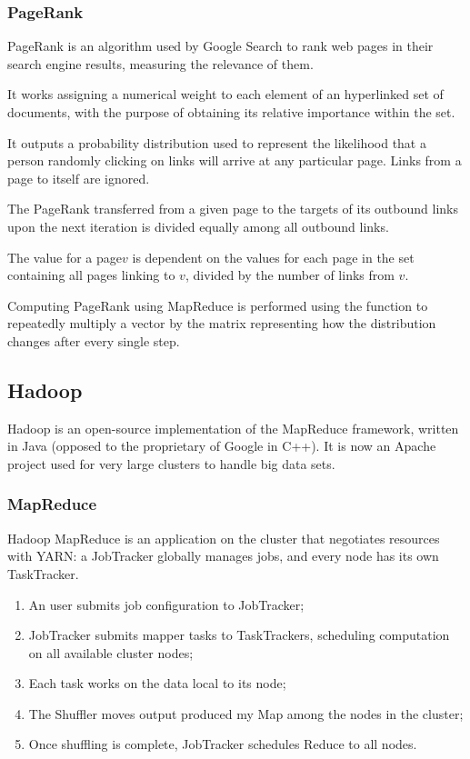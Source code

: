 \subsubsection{PageRank}
PageRank is an algorithm used by Google Search to rank web pages in their search engine results, measuring the relevance of them.

It works assigning a numerical weight to each element of an hyperlinked set of documents, with the purpose of obtaining its relative importance within the set.

It outputs a probability distribution used to represent the likelihood that a person randomly clicking on links will arrive at any particular page. Links from a page to itself are ignored.

The PageRank transferred from a given page to the targets of its outbound links upon the next iteration is divided equally among all outbound links. 

The value for a page$v$  is dependent on the values for each page  in the set containing all pages linking to $v$, divided by the number of links from $v$.

Computing PageRank using MapReduce is performed using the function to repeatedly multiply a vector by the matrix representing how the distribution changes after every single step.


\subsection{Hadoop}
Hadoop is an open-source implementation of the MapReduce framework, written in Java (opposed to the proprietary of Google in C++). It is now an Apache project used for very large clusters to handle big data sets.

\subsubsection{MapReduce}
Hadoop MapReduce is an application on the cluster that negotiates resources with YARN: a JobTracker globally manages jobs, and every node has its own TaskTracker.

\begin{enumerate}
	\item An user submits job configuration to JobTracker;
	\item JobTracker submits mapper tasks to TaskTrackers, scheduling computation on all available cluster nodes;
	\item Each task works on the data local to its node;
	\item The Shuffler moves output produced my Map among the nodes in the cluster;
	\item Once shuffling is complete, JobTracker schedules Reduce to all nodes.
\end{enumerate}

